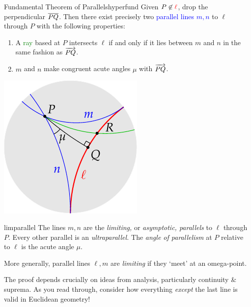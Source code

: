 \begin{thm}[lower separated=false, sidebyside, sidebyside align=top seam, sidebyside gap=0pt, righthand width=0.25\linewidth]{Fundamental Theorem of Parallels}{hyperfund}
	Given $P\not\in\textcolor{red}{\ell}$, drop the perpendicular $\overline{PQ}$. Then there exist precisely two \textcolor{blue}{parallel lines $m,n$} to $\ell$ through $P$ with the following properties:
	\begin{enumerate}\itemsep0pt
	  \item A \textcolor{Green}{ray} based at $P$ intersects $\ell$ if and only if it lies between $m$ and $n$ in the same fashion as $\overrightarrow{PQ}$.
	  \item $m$ and $n$ make congruent acute angles $\mu$ with $\overrightarrow{PQ}$.
	\end{enumerate}
	\tcblower
	\flushright\includegraphics[scale=0.8]{basic-parallels}
\end{thm}

\begin{defn}{}{limparallel}
	The lines $m,n$ are the \emph{limiting,} or \emph{asymptotic, parallels} to $\ell$ through $P$. Every other parallel is an \emph{ultraparallel.} The \emph{angle of parallelism} at $P$ relative to $\ell$ is the acute angle $\mu$.
\end{defn}

More generally, parallel lines $\ell,m$ are \emph{limiting} if they `meet' at an omega-point.\smallbreak


The proof depends crucially on ideas from analysis, particularly continuity \& suprema. As you read through, consider how everything \emph{except} the last line is valid in Euclidean geometry!
 
